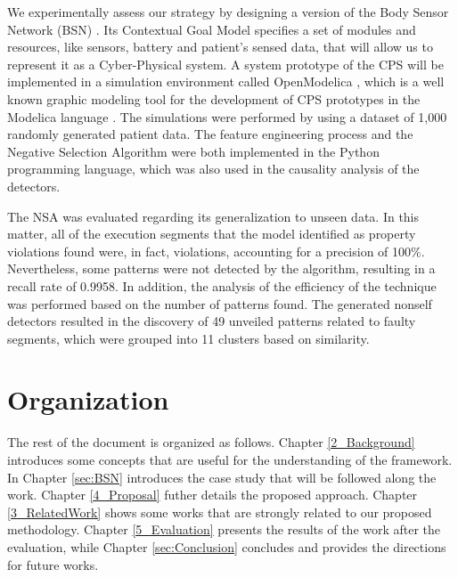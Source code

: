 We experimentally assess our strategy by designing a version of the Body Sensor Network (BSN) \cite{2021BSN}. Its Contextual Goal Model specifies a set of modules and resources, like sensors, battery and patient's sensed data, that will allow us to represent it as a Cyber-Physical system. A system prototype of the CPS will be implemented in a simulation environment called OpenModelica \cite{OpenModelica}, which is a well known graphic modeling tool for the development of CPS prototypes in the Modelica language \cite{Modelica}.
The simulations were performed by using a dataset of 1,000 randomly generated patient data. The feature engineering process and the Negative Selection Algorithm were both implemented in the Python programming language, which was also used in the causality analysis of the detectors.

The NSA was evaluated regarding its generalization to unseen data. In this matter, all of the execution segments that the model identified as property violations found were, in fact, violations, accounting for a precision of 100\%. Nevertheless, some patterns were not detected by the algorithm, resulting in a recall rate of 0.9958. In addition, the analysis of the efficiency of the technique was performed based on the number of patterns found. The generated nonself detectors resulted in the discovery of 49 unveiled patterns related to faulty segments, which were grouped into 11 clusters based on similarity. 

\section{Organization}
The rest of the document is organized as follows. Chapter \ref{2_Background} introduces some concepts that are useful for the understanding of the framework. In Chapter \ref{sec:BSN} introduces the case study that will be followed along the work. Chapter \ref{4_Proposal} futher details the proposed approach. Chapter \ref{3_RelatedWork} shows some works that are strongly related to our proposed methodology. Chapter \ref{5_Evaluation} presents the results of the work after the evaluation, while Chapter \ref{sec:Conclusion} concludes and provides the directions for future works.